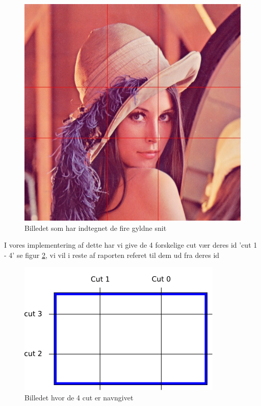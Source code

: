 \begin{figure}[h]
	\begin{center}
		\includegraphics[scale=0.42,angle=0]{afsnit/vores_implementation/billeder/naiv_algoritme/Lenagolden}
	\end{center}
	\caption[]{Billedet som har indtegnet de fire gyldne snit}
	\label{lenasnit2}
\end{figure}

I vores implementering af dette har vi give de 4 forskelige cut vær
deres id 'cut 1 - 4' se figur \ref{cut}, vi vil i reste af raporten
referet til dem ud fra deres id

\begin{figure}[h]
	\begin{center}
		\includegraphics[scale=0.42,angle=0]{afsnit/vores_implementation/billeder/naiv_algoritme/Cut}
	\end{center}
	\caption[]{Billedet hvor de 4 cut er navngivet}
	\label{cut}
\end{figure}


